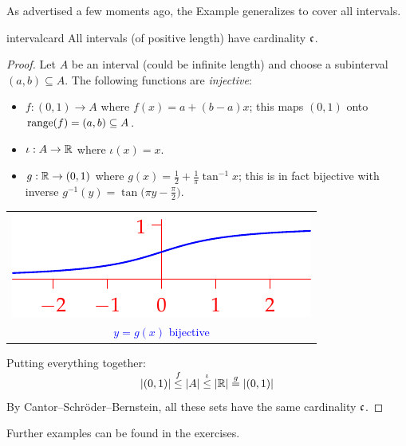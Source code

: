 As advertised a few moments ago, the Example generalizes to cover all intervals.

\begin{cor}{}{intervalcard}
	All intervals (of positive length) have cardinality $\mathfrak{c}$.
\end{cor}

\begin{proof}
	Let $A$ be an interval (could be infinite length) and choose a subinterval $(a,b)\subseteq A$. The following functions are \emph{injective}:\par
	\begin{minipage}[t]{0.6\linewidth}\vspace{0pt}
		\begin{itemize}
	  	\item $f:(0,1)\to A$ where $f(x)=a+(b-a)x$; this maps $(0,1)$ onto $\operatorname{range}(f)=(a,b)\subseteq A$.
	  	\item $\iota:A\to\mathbb{R}$ where $\iota(x)=x$.
	  	\item $g:\mathbb{R}\to(0,1)$ where $g(x)= \frac 12+\frac 1\pi\tan^{-1}x$; this is in fact bijective with inverse $g^{-1}(y)=\tan\bigl(\pi y-\frac\pi 2\bigr)$.
		\end{itemize}
	\end{minipage}
	\hfill
	\begin{minipage}[t]{0.39\linewidth}\vspace{0pt}
		\hfill
		\begin{tabular}{@{}c@{}}
			\includegraphics{cardinality-03-tan}
			\\
			\textcolor{blue}{$y=g(x)$ bijective}
		\end{tabular}
	\end{minipage}
	\bigbreak
	Putting everything together:
	\[
		\smash[t]{\left| (0,1)\right|\overset{f}{\le}\left| A\right|\overset{\iota}{\le}\left| \mathbb{R}\right| \overset{g}{=}\left| (0,1)\right|}
	\]
	By Cantor--Schröder--Bernstein, all these sets have the same cardinality $\mathfrak{c}$.
\end{proof}

Further examples can be found in the exercises.

\vfil\goodbreak



